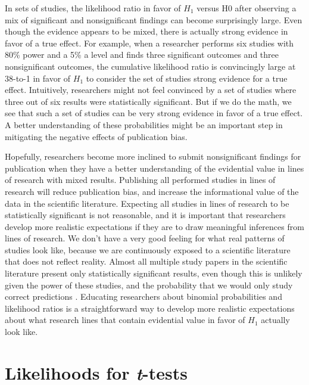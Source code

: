 \documentclass[
  oneside]{krantz}
\begin{document}
In sets of studies, the likelihood ratio in favor of \(H_1\) versus H0 after observing a mix of significant and nonsignificant findings can become surprisingly large. Even though the evidence appears to be mixed, there is actually strong evidence in favor of a true effect. For example, when a researcher performs six studies with 80\% power and a 5\% a level and finds three significant outcomes and three nonsignificant outcomes, the cumulative likelihood ratio is convincingly large at 38-to-1 in favor of \(H_1\) to consider the set of studies strong evidence for a true effect. Intuitively, researchers
might not feel convinced by a set of studies where three out of six results were statistically significant. But if we do the math, we see that such a set of studies can be very strong evidence in favor of a true effect. A better understanding of these probabilities might be an important step in mitigating the negative effects of publication bias.

Hopefully, researchers become more inclined to submit nonsignificant findings for publication when they have a better understanding of the evidential value in lines of research with mixed results. Publishing all performed studies in lines of research will reduce publication bias, and increase the informational value of the data in the scientific literature. Expecting all studies in lines of research to be statistically significant is not reasonable, and it is important that researchers develop more realistic expectations if they are to draw meaningful inferences from lines of research. We don't have a very good feeling for what real patterns of studies look like, because we are continuously exposed to a scientific literature that does not reflect reality. Almost all multiple study papers in the scientific literature present only statistically significant results, even though this is unlikely given the power of these studies, and the probability that we would only study correct predictions \citep{scheel_excess_2021}. Educating researchers about binomial probabilities and likelihood ratios is a straightforward way to develop more realistic expectations about what research lines that contain evidential value in favor of \(H_1\) actually look like.

\hypertarget{likettest}{%
\section{\texorpdfstring{Likelihoods for \emph{t}-tests}{Likelihoods for t-tests}}\label{likettest}}
\end{document}
